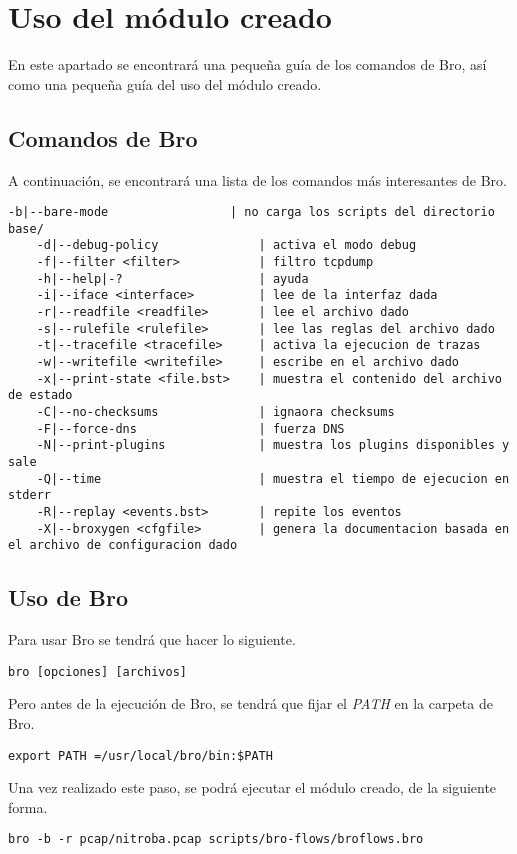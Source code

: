 \chapter{Uso del módulo creado}\label{cap.uso}

En este apartado se encontrará una pequeña guía de los comandos de Bro, así como una pequeña guía del uso del módulo creado.

\section{Comandos de Bro}

A continuación, se encontrará una lista de los comandos más interesantes de Bro.

\begin{lstlisting}[style=Consola]
    -b|--bare-mode                 | no carga los scripts del directorio base/
    -d|--debug-policy              | activa el modo debug
    -f|--filter <filter>           | filtro tcpdump
    -h|--help|-?                   | ayuda
    -i|--iface <interface>         | lee de la interfaz dada
    -r|--readfile <readfile>       | lee el archivo dado
    -s|--rulefile <rulefile>       | lee las reglas del archivo dado
    -t|--tracefile <tracefile>     | activa la ejecucion de trazas 
    -w|--writefile <writefile>     | escribe en el archivo dado
    -x|--print-state <file.bst>    | muestra el contenido del archivo de estado
    -C|--no-checksums              | ignaora checksums
    -F|--force-dns                 | fuerza DNS
    -N|--print-plugins             | muestra los plugins disponibles y sale
    -Q|--time                      | muestra el tiempo de ejecucion en stderr
    -R|--replay <events.bst>       | repite los eventos
    -X|--broxygen <cfgfile>        | genera la documentacion basada en el archivo de configuracion dado   

\end{lstlisting}

\section{Uso de Bro}

Para usar Bro se tendrá que hacer lo siguiente.

\begin{lstlisting}[style=Consola]
	bro [opciones] [archivos]
\end{lstlisting}

\intro Pero antes de la ejecución de Bro, se tendrá que fijar el \textit{PATH} en la carpeta de Bro.

\begin{lstlisting}[style=Consola]
	export PATH =/usr/local/bro/bin:$PATH
\end{lstlisting}

\intro Una vez realizado este paso, se podrá ejecutar el módulo creado, de la siguiente forma.

\begin{lstlisting}[style=Consola]
	bro -b -r pcap/nitroba.pcap scripts/bro-flows/broflows.bro
\end{lstlisting}

